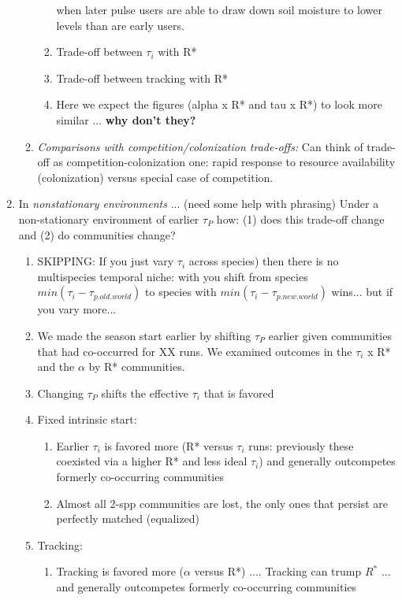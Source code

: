 \documentclass[11pt,letterpaper]{article}
\begin{document}
\begin{enumerate}
\begin{enumerate}
\begin{enumerate}
when later pulse users are able to draw down soil moisture to lower levels than are early users.
\item Trade-off between $\tau_i$ with R*
\item Trade-off between tracking with R*
\item Here we expect the figures (alpha x R* and tau x R*) to look more similar ... {\bf why don't they?}
\end{enumerate}
\item \emph{Comparisons with competition/colonization trade-offs:} Can think of trade-off as competition-colonization one: rapid response to resource availability (colonization) versus special case of competition.\\
\end{enumerate}
\item In \emph{nonstationary environments} ... (need some help with phrasing)
Under a non-stationary environment of earlier $\tau_P$ how: (1) does this trade-off change and (2) do communities change?
\begin{enumerate}
\item SKIPPING: If you just vary $\tau_i$ across species) then there is no multispecies temporal niche: with you shift from species $min(\tau_i - \tau_{p.old.world})$ to species with $min(\tau_i - \tau_{p.new.world})$ wins... but if you vary more...
\item We made the season start earlier by shifting $\tau_P$ earlier given communities that had co-occurred for XX runs. We examined outcomes in the $\tau_i$ x R* and the $\alpha$ by R* communities. 
\item Changing $\tau_P$ shifts the effective $\tau_i$ that is favored %
\item Fixed intrinsic start: 
\begin{enumerate}
\item Earlier $\tau_i$ is favored more (R* versus $\tau_i$ runs: previously these coexisted via a higher R* and less ideal $\tau_i$) and generally outcompetes formerly co-occurring communities
\item Almost all 2-spp communities are lost, the only ones that persist are perfectly matched (equalized)
\end{enumerate}
\item Tracking: 
\begin{enumerate}
\item Tracking is favored more ($\alpha$ versus R*)  .... Tracking can trump $R^*$ ... and generally outcompetes formerly co-occurring communities %

\end{enumerate}
\end{enumerate}
\end{enumerate}
\end{document}
